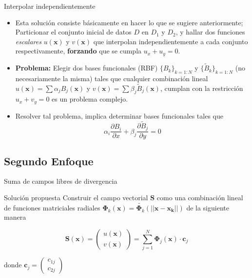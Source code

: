 \documentclass{beamer}
\begin{document}
\begin{frame}{Interpolar independientemente}
  \begin{itemize}
    \item{
      Esta solución consiste básicamente en hacer lo que se sugiere anteriormente; Particionar el conjunto inicial de datos $D$ en $D_1$ y $D_2$, y hallar dos funciones \textit{escalares} $u(\mathbf{x})$ y $v(\mathbf{x})$ que interpolan independientemente a cada conjunto respectivamente, \textbf{forzando} que se cumpla $u_x + u_y = 0$.
    }
    \item{
      \textbf{Problema:} Elegir dos bases funcionales (RBF) $\{B_k\}_{k=1:N}$ y ${\{\widetilde{B}_k\}_{k=1:N}}$ (no necesariamente la misma) tales que cualquier combinación lineal $u(\mathbf{x})=\sum \alpha_j B_j(\mathbf{x})$ y $v(\mathbf{x})=\sum \beta_j \widetilde{B}_j(\mathbf{x})$, cumplan con la restricción $u_x+v_y=0$ es un problema complejo.
    }
    \item{
      Resolver tal problema, implica determinar bases funcionales tales que
      $$\alpha_i \frac{\partial B_i}{\partial x} + \beta_j \frac{\partial \widetilde{B}_j}{\partial y} = 0 $$
    }
  \end{itemize}
\end{frame}

\subsection{Segundo Enfoque}

\begin{frame}{Suma de campos libres de divergencia}

\begin{block}{Solución propuesta}
  Construir el campo vectorial $\mathbf{S}$ como una combinación lineal de funciones matriciales radiales  
  $\mathbf{\Phi}_k(\mathbf{x})=\widetilde{\mathbf{\Phi}_k}(\mathbf{||\mathbf{x}-\mathbf{x}_k||})$ de la siguiente manera

  $$ \mathbf{S}(\mathbf{x}) =
  \begin{pmatrix} u(\mathbf{x})\\v(\mathbf{x})\end{pmatrix} =
  \sum_{j=1}^{N} \mathbf{\Phi}_j(\mathbf{x}) \cdot \mathbf{c}_j
  $$

  donde $\mathbf{c}_j=\begin{pmatrix} c_{1j} \\ c_{2j} \end{pmatrix}$

\end{block}
\end{frame}
\end{document}
